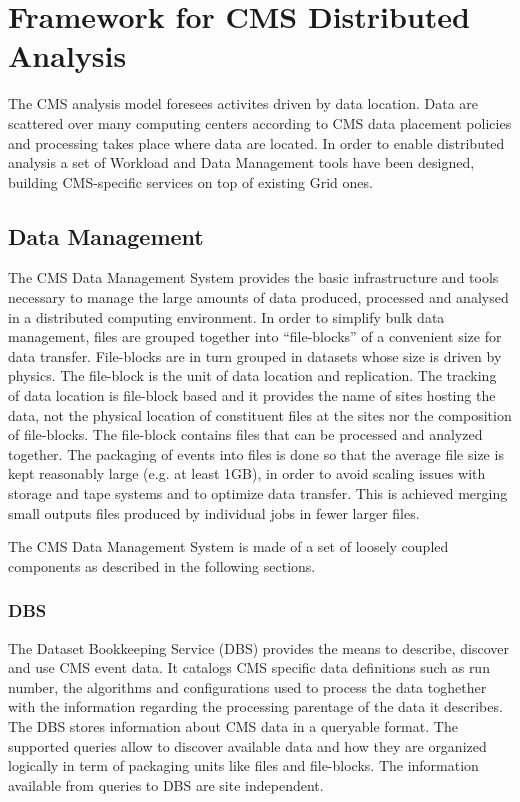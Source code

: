 \section{Framework for CMS Distributed Analysis}
\label{sec:3}
The CMS analysis model foresees activites driven by data location. Data are scattered over many computing centers according to CMS data placement policies and processing takes place where data are located. In order to enable distributed analysis a set of Workload and Data Management tools have been designed, building CMS-specific services on top of existing Grid ones.

\subsection{Data Management}
\label{sec:3_1}
The CMS Data Management System provides the basic infrastructure and tools necessary to manage the large amounts of data produced, processed and analysed in a distributed computing environment. 
In order to simplify bulk data management, files are grouped together into “file-blocks”  of a convenient size for data transfer. %
File-blocks are in turn grouped in datasets whose size is driven by physics.
The file-block is the unit of data location and replication. 
The tracking of data location is file-block based and it provides the name of sites hosting the data, not the physical location of constituent files at the sites nor the composition of file-blocks.
The file-block contains files that can be processed and analyzed together.
The packaging of events into files is done so that the average file size is
kept reasonably large (e.g. at least 1GB), in order to avoid scaling issues with storage and tape systems and to optimize data transfer.
This is achieved merging small outputs files produced by individual jobs in fewer larger files.

The CMS Data Management System is made of a set of loosely coupled components as described in the following sections.
\subsubsection{DBS}
\label{sec:3_1_1}
The Dataset Bookkeeping Service (DBS)\cite{RefDBS} provides the means to describe, discover and use CMS event data. 
It catalogs CMS specific data definitions such as run number, the algorithms and configurations used to process the data toghether with the information regarding the processing parentage of the data it describes.
The DBS stores information about CMS data in a queryable format. The supported queries allow to discover available data and how they are organized logically in term of packaging units like files and file-blocks. The information available from queries to DBS are site independent.

